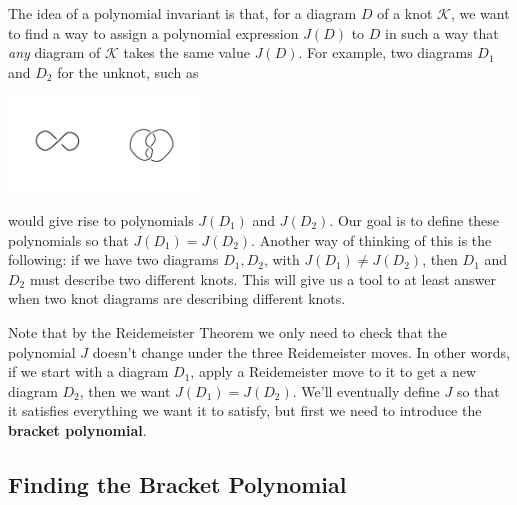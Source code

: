\documentclass[12 pt]{article}
\begin{document}
The idea of a polynomial invariant is that, for a diagram $D$ of a knot $\mathcal{K}$, we want to find a way to assign a polynomial expression $J(D)$ to $D$ in such a way that \textit{any} diagram of $\mathcal{K}$ takes the same value $J(D)$. For example, two diagrams $D_1$ and $D_2$ for the unknot, such as
\begin{center}
\includegraphics[height = 1in]{unknot_2.jpg}\quad\includegraphics[height = 1in]{unknot_3.jpg}
\end{center}
would give rise to polynomials $J(D_1)$ and $J(D_2)$. Our goal is to define these polynomials so that $J(D_1)=J(D_2)$. Another way of thinking of this is the following: if we have two diagrams $D_1,D_2$, with $J(D_1)\neq J(D_2)$, then $D_1$ and $D_2$ must describe two different knots. This will give us a tool to at least answer when two knot diagrams are describing different knots.

Note that by the Reidemeister Theorem we only need to check that the polynomial $J$ doesn't change under the three Reidemeister moves. In other words, if we start with a diagram $D_1$, apply a Reidemeister move to it to get a new diagram $D_2$, then we want $J(D_1)=J(D_2)$. We'll eventually define $J$ so that it satisfies everything we want it to satisfy, but first we need to introduce the {\bf bracket polynomial}.

\subsection{Finding the Bracket Polynomial}
\end{document}
